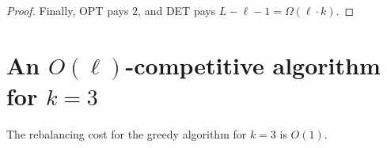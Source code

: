 \begin{proof}
  Finally, OPT pays $2$, and DET pays $L - \ell - 1 = \Omega(\ell \cdot k)$.


  

  

 
  

  
  
  

  
  
\end{proof}

\section{An $O(\ell)$-competitive algorithm for $k=3$}

\begin{theorem}
  The rebalancing cost for the greedy algorithm for $k=3$ is $O(1)$.
  \label{rebalancing-cost}
\end{theorem}


